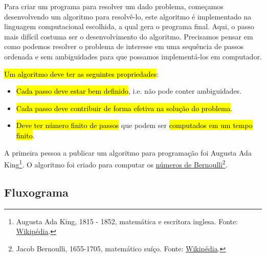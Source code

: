 Para criar um programa para resolver um dado problema, começamos desenvolvendo um algoritmo para resolvê-lo, este algoritmo é implementado na linguagem computacional escolhida, a qual gera o programa final. Aqui, o passo mais difícil costuma ser o desenvolvimento do algoritmo. Precisamos pensar em como podemos resolver o problema de interesse em uma sequência de passos ordenada e sem ambiguidades para que possamos implementá-los em computador.

\hl{Um algoritmo deve ter as seguintes propriedades}:
\begin{itemize}
\item \hl{Cada passo deve estar bem definido}, i.e. não pode conter ambiguidades.
\item \hl{Cada passo deve contribuir de forma efetiva na solução do problema}.
\item \hl{Deve ter número finito de passos} que podem ser \hl{computados em um tempo finito}.
\end{itemize}

\begin{obs}
  A primeira pessoa a publicar um algoritmo para programação foi Augusta Ada King\footnote{Augusta Ada King, 1815 - 1852, matemática e escritora inglesa. Fonte: \href{https://pt.wikipedia.org/wiki/Ada_Lovelace}{Wikipédia}.}. O algoritmo foi criado para computar os \href{https://pt.wikipedia.org/wiki/N\%C3\%BAmeros\_de\_Bernoulli}{números de Bernoulli}\footnote{Jacob Bernoulli, 1655-1705, matemático suíço. Fonte: \href{https://pt.wikipedia.org/wiki/Jakob_Bernoulli}{Wikipédia}.}.
\end{obs}


\subsection{Fluxograma}

